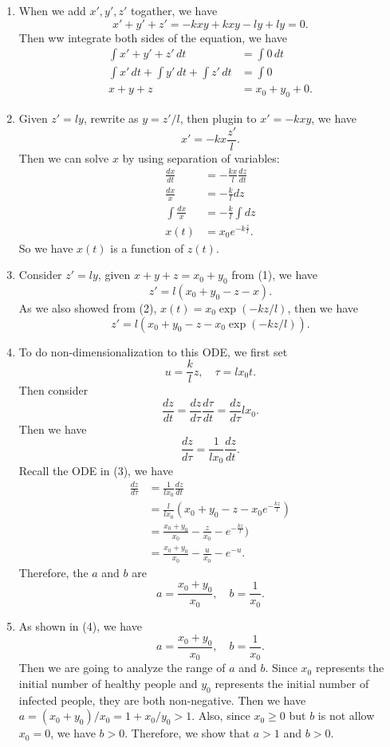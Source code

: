 \documentclass[12pt]{exam}
\begin{document}
\begin{enumerate}
	\item When we add $x', y', z'$ togather, we have
		\[x'+y'+z' = -kxy+kxy-ly+ly = 0.\]
		Then ww integrate both sides of the equation, we have
		\begin{align*}
			\int x'+y'+z' \, dt &= \int 0 \, dt \\
			\int x' \, dt + \int y' \, dt + \int z' \, dt &= \int 0 \\
			x+y+z &= x_0+y_0 +0.
		\end{align*}
	
	\item Given $z'=ly$, rewrite as $y=z'/l$, then plugin to $x'=-kxy$, we have
		\[x'=-kx\frac{z'}{l}.\]
		Then we can solve $x$ by using separation of variables:
		\begin{align*}
			\frac{dx}{dt} &= -\frac{kx}{l}\frac{dz}{dt} \\
			\frac{dx}{x} &= -\frac{k}{l}dz \\
			\int \frac{dx}{x} &= -\frac{k}{l}\int dz \\
			x(t) &= x_0e^{-k\frac{z}{l}}.
		\end{align*}
		So we have $x(t)$ is a function of $z(t)$.

	\item Consider $z'=ly$, given $x+y+z=x_0+y_0$ from (1), we have
		\[z' = l(x_0+y_0-z-x).\]
		As we also showed from (2), $x(t) = x_0\exp(-kz/l)$, then we have
		\[z' = l(x_0+y_0-z-x_0\exp(-kz/l)).\]
		
	\item To do non-dimensionalization to this ODE, we first set
		\[u = \frac{k}{l}z, \quad \tau = lx_0t.\]
		Then consider
		\[\frac{dz}{dt} = \frac{dz}{d\tau}\frac{d\tau}{dt} = \frac{dz}{d\tau}lx_0.\]
		Then we have
		\[\frac{dz}{d\tau} = \frac{1}{lx_0}\frac{dz}{dt}.\]
		Recall the ODE in (3), we have
		\begin{align*}
			\frac{dz}{d\tau} &= \frac{1}{lx_0}\frac{dz}{dt} \\
					 &= \frac{l}{lx_0}(x_0+y_0-z-x_0 e^{-\frac{kz}{l}}) \\
			&= \frac{x_0+y_0}{x_0}-\frac{z}{x_0}-e^{-\frac{kz}{l}}) \\
			&= \frac{x_0+y_0}{x_0}-\frac{u}{x_0}-e^{-u}.
		\end{align*}
		Therefore, the $a$ and $b$ are	
		\[a = \frac{x_0+y_0}{x_0}, \quad b = \frac{1}{x_0}.\]
		
	\item As shown in (4), we have
		\[a=\frac{x_0+y_0}{x_0}, \quad b=\frac{1}{x_0}.\]
		Then we are going to analyze the range of $a$ and $b$.
	Since $x_0$ represents the initial number of healthy people and $y_0$ represents the initial number of infected people, they are both non-negative. Then we have $a=(x_0+y_0)/x_0=1+x_0/y_0 > 1$. Also, since $x_0 \geq 0$ but $b$ is not allow $x_0=0$, we have $b > 0$. Therefore, we show that $a>1$ and $b>0$.






\end{enumerate}
\end{document}

